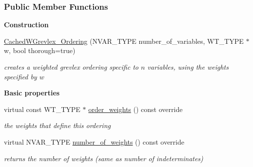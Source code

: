 \subsubsection*{Public Member Functions}
\begin{Indent}\textbf{ Construction}\par
\begin{DoxyCompactItemize}
\item 
\hyperlink{group__orderinggroup_a107617c77aaebe5ba74973af66ab75b6}{Cached\+W\+Grevlex\+\_\+\+Ordering} (N\+V\+A\+R\+\_\+\+T\+Y\+PE number\+\_\+of\+\_\+variables, W\+T\+\_\+\+T\+Y\+PE $\ast$w, bool thorough=true)
\begin{DoxyCompactList}\small\item\em creates a weighted grevlex ordering specific to $n$ variables, using the weights specified by $w$ \end{DoxyCompactList}\end{DoxyCompactItemize}
\end{Indent}
\begin{Indent}\textbf{ Basic properties}\par
\begin{DoxyCompactItemize}
\item 
\mbox{\label{group__orderinggroup_a4997585d5bc84222551e555eac13ebf9}} 
virtual const W\+T\+\_\+\+T\+Y\+PE $\ast$ \hyperlink{group__orderinggroup_a4997585d5bc84222551e555eac13ebf9}{order\+\_\+weights} () const override
\begin{DoxyCompactList}\small\item\em the weights that define this ordering \end{DoxyCompactList}\item 
\mbox{\label{group__orderinggroup_aabbf09fabf721a0f894110b0f5651730}} 
virtual N\+V\+A\+R\+\_\+\+T\+Y\+PE \hyperlink{group__orderinggroup_aabbf09fabf721a0f894110b0f5651730}{number\+\_\+of\+\_\+weights} () const override
\begin{DoxyCompactList}\small\item\em returns the number of weights (same as number of indeterminates) \end{DoxyCompactList}\end{DoxyCompactItemize}
\end{Indent}
